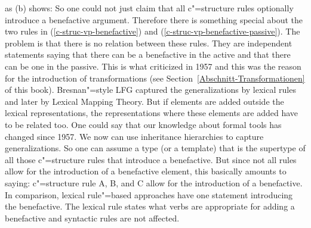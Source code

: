 as (b) shows:
\eal
{}
\zl
So one could not just claim that all c"=structure rules optionally introduce a benefactive
argument. Therefore there is something special about the two rules in (\ref{c-struc-vp-benefactive})
and (\ref{c-struc-vp-benefactive-passive}). The problem is that there is no relation between these
rules. They are independent statements saying that there can be a benefactive in the active and that
there can be one in the passive. This is what \citet[]{Chomsky57a} criticized in 1957 and
this was the reason for the introduction of transformations (see
Section~\ref{Abschnitt-Transformationen} of this book). Bresnan"=style LFG captured the
generalizations by lexical rules and later by Lexical Mapping Theory. But if elements are added
outside the lexical representations, the representations where these elements are added 
have to be related too. One could say that our knowledge about formal tools has changed since
1957. We now can use inheritance hierarchies to capture generalizations. So one can assume a type
(or a template) that is the supertype of all those c"=structure rules that introduce a
benefactive. But since not all rules allow for the introduction of a benefactive element, this
basically amounts to saying: c"=structure rule A, B, and C allow for the introduction of a
benefactive. In comparison, lexical rule"=based approaches have one statement introducing the
benefactive. The lexical rule states what verbs are appropriate for adding a benefactive and
syntactic rules are not affected.

